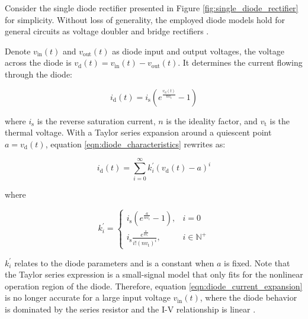 Consider the single diode rectifier presented in Figure \ref{fig:single_diode_rectifier} for simplicity. Without loss of generality, the employed diode models hold for general circuits as voltage doubler and bridge rectifiers \cite{Clerckx2017}.

Denote ${v_{{\text{in}}}}(t)$ and ${v_{{\text{out}}}}(t)$ as diode input and output voltages, the voltage across the diode is ${v_{\text{d}}}(t) = {v_{{\text{in}}}}(t) - {v_{{\text{out}}}}(t)$. It determines the current flowing through the diode:

\begin{equation}\label{eqn:diode_characteristics}
  {i_{\text{d}}}(t) = {i_{\text{s}}}\left( {{e^{\frac{{{v_{\text{d}}}(t)}}{{n{v_{\text{t}}}}}}} - 1} \right)
\end{equation}

where ${i_{\text{s}}}$ is the reverse saturation current, $n$ is the ideality factor, and ${{v_{\text{t}}}}$ is the thermal voltage. With a Taylor series expansion around a quiescent point $a = {v_{\text{d}}}(t)$, equation \ref{eqn:diode_characteristics} rewrites as:

\begin{equation}\label{eqn:diode_current_expansion}
  {i_{\text{d}}}(t) = \sum\limits_{i = 0}^\infty  {k_i^\prime } {\left( {{v_{\text{d}}}(t) - a} \right)^i}
\end{equation}

where

\begin{equation}\label{eqn:diode_k_prime}
  k_i^\prime  = \left\{ {
  \begin{array}{*{20}{c}}
    {{i_{\text{s}}}\left( {{e^{\frac{a}{{n{v_{\text{t}}}}}}} - 1} \right),}&{i = 0} \\
    {{i_{\text{s}}}\frac{{{e^{\frac{a}{{n{v_{\text{t}}}}}}}}}{{i!{{\left( {n{v_{\text{t}}}} \right)}^i}}},}&{i \in {\mathbb{N}^ + }}
  \end{array}} \right.
\end{equation}


$k_i^\prime $ relates to the diode parameters and is a constant when $a$ is fixed. Note that the Taylor series expression is a small-signal model that only fits for the nonlinear operation region of the diode. Therefore, equation \ref{eqn:diode_current_expansion} is no longer accurate for a large input voltage ${v_{{\text{in}}}}(t)$, where the diode behavior is dominated by the series resistor and the I-V relationship is linear \cite{Boaventura2013}.

